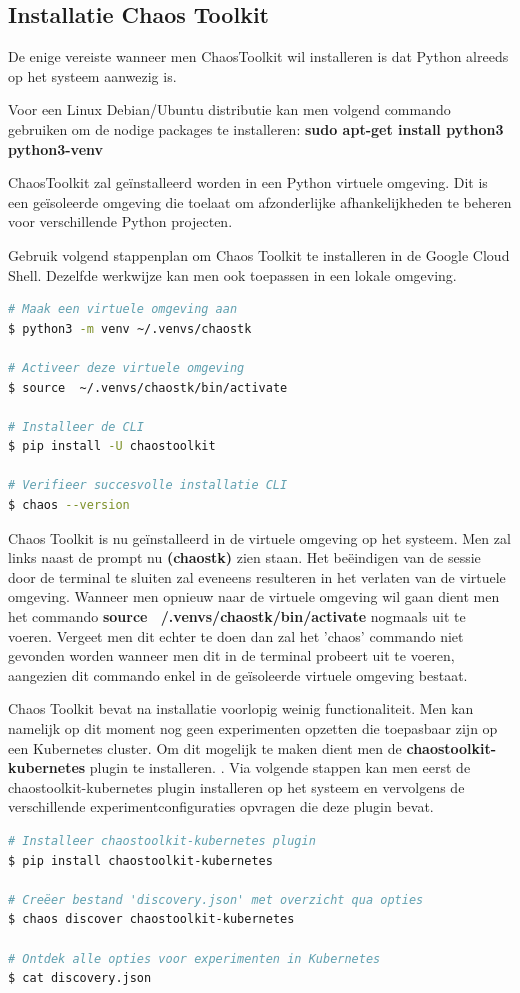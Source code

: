 \subsection{Installatie Chaos Toolkit}

De enige vereiste wanneer men ChaosToolkit wil installeren is dat Python alreeds op het systeem aanwezig is. \autocite{ChaosToolkit2022b}

Voor een Linux Debian/Ubuntu distributie kan men volgend commando gebruiken om de nodige packages te installeren: {\bf sudo apt-get install python3 python3-venv}
 
ChaosToolkit zal geïnstalleerd worden in een Python virtuele omgeving. Dit is een geïsoleerde omgeving die toelaat om afzonderlijke afhankelijkheden te beheren voor verschillende Python projecten. \autocite{Uni2022}

Gebruik volgend stappenplan om Chaos Toolkit te installeren in de Google Cloud Shell. Dezelfde werkwijze kan men ook toepassen in een lokale omgeving.
\begin{lstlisting}[language=bash]
# Maak een virtuele omgeving aan
$ python3 -m venv ~/.venvs/chaostk

# Activeer deze virtuele omgeving
$ source  ~/.venvs/chaostk/bin/activate

# Installeer de CLI
$ pip install -U chaostoolkit

# Verifieer succesvolle installatie CLI
$ chaos --version
\end{lstlisting}

Chaos Toolkit is nu geïnstalleerd in de virtuele omgeving op het systeem. Men zal links naast de prompt nu {\bf (chaostk)} zien staan.
 Het beëindigen van de sessie door de terminal te sluiten zal eveneens resulteren in het verlaten van de virtuele omgeving. Wanneer men opnieuw naar de virtuele omgeving wil gaan dient men het commando {\bf source  ~/.venvs/chaostk/bin/activate} nogmaals uit te voeren. Vergeet men dit echter te doen dan zal het 'chaos' commando niet gevonden worden wanneer men dit in de terminal probeert uit te voeren, aangezien dit commando enkel in de geïsoleerde virtuele omgeving bestaat.

Chaos Toolkit bevat na installatie voorlopig weinig functionaliteit. Men kan namelijk op dit moment nog geen experimenten opzetten die toepasbaar zijn op een Kubernetes cluster. Om dit mogelijk te maken dient men de {\bf chaostoolkit-kubernetes} plugin te installeren. \autocite{ChaosToolkit2022}. 
Via volgende stappen kan men eerst de chaostoolkit-kubernetes plugin installeren op het systeem en vervolgens de verschillende experimentconfiguraties opvragen die deze plugin bevat.
\begin{lstlisting}[language=bash]
# Installeer chaostoolkit-kubernetes plugin
$ pip install chaostoolkit-kubernetes

# Creëer bestand 'discovery.json' met overzicht qua opties
$ chaos discover chaostoolkit-kubernetes

# Ontdek alle opties voor experimenten in Kubernetes
$ cat discovery.json

\end{lstlisting}

